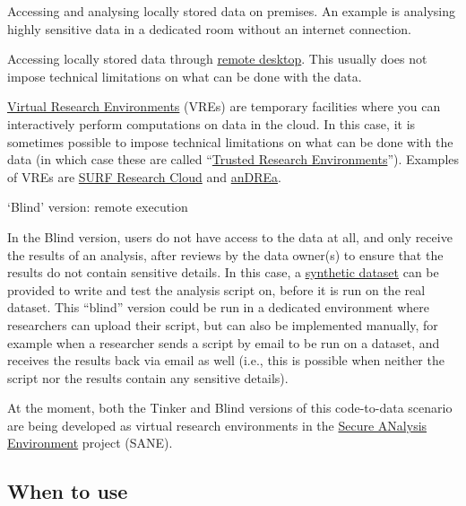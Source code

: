 \documentclass[
]{book}
\begin{document}
Accessing and analysing locally stored data on premises. An example is
analysing highly sensitive data in a dedicated room without an internet
connection.

Accessing locally stored data through
\href{https://manuals.uu.nl/en/manual/solisworkspace-faq/}{remote desktop}.
This usually does not impose technical limitations on what can be done with
the data.

\href{https://www.uu.nl/en/research/research-data-management/tools-services/software-and-computing/virtual-research-environments}{Virtual Research Environments}
(VREs) are temporary facilities where you can interactively perform
computations on data in the cloud. In this case, it is sometimes possible to
impose technical limitations on what can be done with the data (in which case
these are called
``\href{https://the-turing-way.netlify.app/project-design/sdpw/trew.html}{Trusted Research Environments}'').
Examples of VREs are
\href{https://www.surf.nl/en/surf-research-cloud-collaboration-portal-for-research}{SURF Research Cloud}
and \href{https://www.andrea-cloud.eu/}{anDREa}.

`Blind' version: remote execution

In the Blind version, users do not have access to the data
at all, and only receive the results of an analysis, after reviews by the data
owner(s) to ensure that the results do not contain sensitive details. In this
case, a \protect\hyperlink{synthetic-data}{synthetic dataset} can be provided to write and test
the analysis script on, before it is run on the real dataset. This ``blind''
version could be run in a dedicated environment where researchers can upload
their script, but can also be implemented manually, for example when a
researcher sends a script by email to be run on a dataset, and receives the
results back via email as well (i.e., this is possible when neither the script
nor the results contain any sensitive details).

At the moment, both the Tinker and Blind versions of this code-to-data scenario
are being developed as virtual research environments in the
\href{https://www.surf.nl/en/news/sane-secure-data-environment-for-social-sciences-and-humanities}{Secure ANalysis Environment}
project (SANE).

\hypertarget{when-to-use-1}{%
\subsection{When to use}\label{when-to-use-1}}
\end{document}
